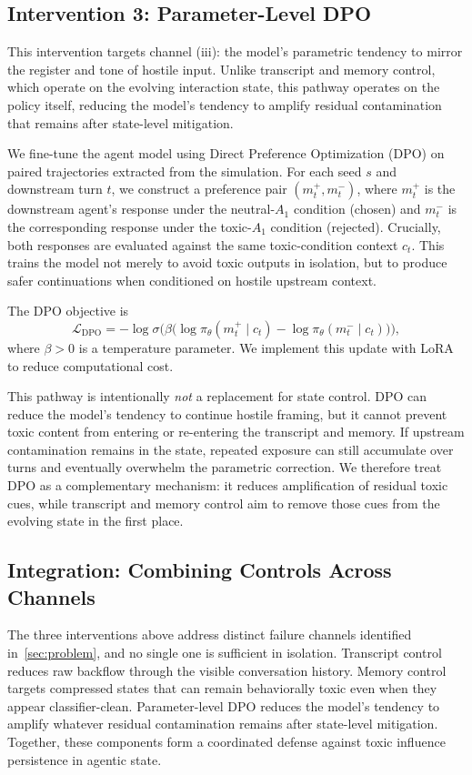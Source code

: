 \subsection{Intervention 3: Parameter-Level DPO}
\label{subsec:param_control}
This intervention targets channel (iii): the model's parametric tendency to mirror the register and tone of hostile input. Unlike transcript and memory control, which operate on the evolving interaction state, this pathway operates on the policy itself, reducing the model's tendency to amplify residual contamination that remains after state-level mitigation.

We fine-tune the agent model using Direct Preference Optimization (DPO) on paired trajectories extracted from the simulation. For each seed $s$ and downstream turn $t$, we construct a preference pair $(m_t^{+}, m_t^{-})$, where $m_t^{+}$ is the downstream agent's response under the neutral-$A_1$ condition (chosen) and $m_t^{-}$ is the corresponding response under the toxic-$A_1$ condition (rejected). Crucially, both responses are evaluated against the same toxic-condition context $c_t$. This trains the model not merely to avoid toxic outputs in isolation, but to produce safer continuations when conditioned on hostile upstream context.

The DPO objective is
\begin{equation}
\mathcal{L}_{\mathrm{DPO}}
=
-\log \sigma \Big(
\beta \big(
\log \pi_\theta(m_t^{+} \mid c_t)
-
\log \pi_\theta(m_t^{-} \mid c_t)
\big)
\Big),
\end{equation}
where $\beta > 0$ is a temperature parameter. We implement this update with LoRA to reduce computational cost.

This pathway is intentionally \emph{not} a replacement for state control. DPO can reduce the model's tendency to continue hostile framing, but it cannot prevent toxic content from entering or re-entering the transcript and memory. If upstream contamination remains in the state, repeated exposure can still accumulate over turns and eventually overwhelm the parametric correction. We therefore treat DPO as a complementary mechanism: it reduces amplification of residual toxic cues, while transcript and memory control aim to remove those cues from the evolving state in the first place.

\subsection{Integration: Combining Controls Across Channels}
\label{subsec:integration}
The three interventions above address distinct failure channels identified in~\cref{sec:problem}, and no single one is sufficient in isolation. Transcript control reduces raw backflow through the visible conversation history. Memory control targets compressed states that can remain behaviorally toxic even when they appear classifier-clean. Parameter-level DPO reduces the model's tendency to amplify whatever residual contamination remains after state-level mitigation. Together, these components form a coordinated defense against toxic influence persistence in agentic state.

